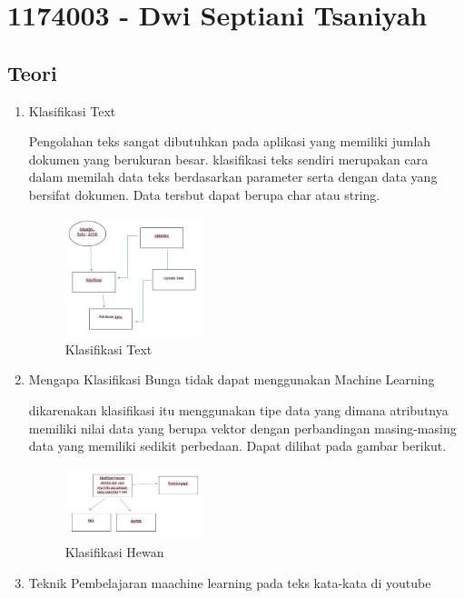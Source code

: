 \section{1174003 - Dwi Septiani Tsaniyah}
    \subsection{Teori}
    \begin{enumerate}
        \item Klasifikasi Text
        
        Pengolahan teks sangat dibutuhkan pada aplikasi yang memiliki jumlah dokumen yang berukuran besar. klasifikasi teks sendiri merupakan cara dalam memilah data teks berdasarkan parameter serta dengan data yang bersifat dokumen. Data tersbut dapat berupa char atau string.
        \begin{figure}[H]
            \includegraphics[width=4cm]{figures/1174003/4/klasifikasi.jpg}
            \centering
            \caption{Klasifikasi Text}
        \end{figure}

        \item Mengapa Klasifikasi Bunga tidak dapat menggunakan Machine Learning
        
        dikarenakan klasifikasi itu menggunakan tipe data yang dimana atributnya memiliki nilai data yang berupa vektor dengan perbandingan masing-masing data yang memiliki sedikit perbedaan. Dapat dilihat pada gambar berikut.
        \begin{figure}[H]
            \includegraphics[width=4cm]{figures/1174003/4/hewan.jpg}
            \centering
            \caption{Klasifikasi Hewan}
        \end{figure}

        \item Teknik Pembelajaran maachine learning pada teks kata-kata di youtube
        

\end{enumerate}
